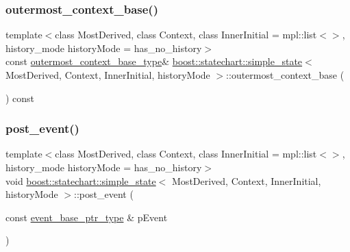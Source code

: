 \subsubsection{\texorpdfstring{outermost\+\_\+context\+\_\+base()}{outermost\_context\_base()}\hspace{0.1cm}{\footnotesize\ttfamily [2/2]}}
{\footnotesize\ttfamily template$<$class Most\+Derived, class Context, class Inner\+Initial = mpl\+::list$<$$>$, history\+\_\+mode history\+Mode = has\+\_\+no\+\_\+history$>$ \\
const \mbox{\hyperlink{classboost_1_1statechart_1_1simple__state_a50f21d7a7d6632eb34430e74cbad3197}{outermost\+\_\+context\+\_\+base\+\_\+type}}\& \mbox{\hyperlink{classboost_1_1statechart_1_1simple__state}{boost\+::statechart\+::simple\+\_\+state}}$<$ Most\+Derived, Context, Inner\+Initial, history\+Mode $>$\+::outermost\+\_\+context\+\_\+base (\begin{DoxyParamCaption}{ }\end{DoxyParamCaption}) const\hspace{0.3cm}{\ttfamily [inline]}}

\mbox{\label{classboost_1_1statechart_1_1simple__state_a67205f8400d43e13a51cfb4a4a382ce5}} 
\subsubsection{\texorpdfstring{post\+\_\+event()}{post\_event()}\hspace{0.1cm}{\footnotesize\ttfamily [1/2]}}
{\footnotesize\ttfamily template$<$class Most\+Derived, class Context, class Inner\+Initial = mpl\+::list$<$$>$, history\+\_\+mode history\+Mode = has\+\_\+no\+\_\+history$>$ \\
void \mbox{\hyperlink{classboost_1_1statechart_1_1simple__state}{boost\+::statechart\+::simple\+\_\+state}}$<$ Most\+Derived, Context, Inner\+Initial, history\+Mode $>$\+::post\+\_\+event (\begin{DoxyParamCaption}\item[{const \mbox{\hyperlink{classboost_1_1statechart_1_1simple__state_aeea28c41a57acb4507e30ca5adb6016f}{event\+\_\+base\+\_\+ptr\+\_\+type}} \&}]{p\+Event }\end{DoxyParamCaption})\hspace{0.3cm}{\ttfamily [inline]}}

